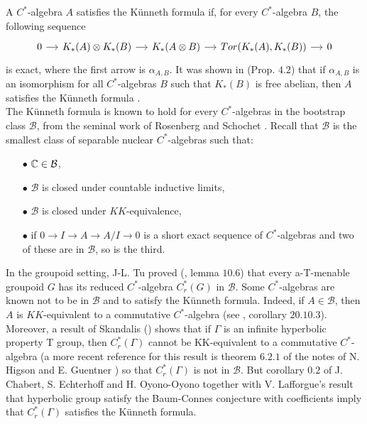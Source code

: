 A $C^*$-algebra $A$ satisfies the Künneth formula if, for every $C^*$-algebra $B$, the following sequence 
\[\begin{tikzcd}[column sep = small] 
0 \arrow{r} & K_*(A)\otimes K_*(B)\arrow{r} & K_*(A\otimes B) \arrow{r} & Tor(K_*(A),K_*(B))\arrow{r} & 0 
\end{tikzcd}\]
is exact, where the first arrow is $\alpha_{A,B}$. It was shown in \cite{ChabertEOY} (Prop. $4.2$) that if $\alpha_{A,B}$ is an isomorphism for all $C^*$-algebras $B$ such that $K_*(B)$ is free abelian, then $A$ satisfies the Künneth formula .\\ 

The Künneth formula is known to hold for every $C^*$-algebras in the bootstrap class $\mathcal B$, from the seminal work of Rosenberg and Schochet \cite{RosenbergKunneth}. Recall that $\mathcal B$ is the smallest class of separable nuclear $C^*$-algebras such that:
\begin{itemize}
\item[$\bullet$] $\mathbb C \in \mathcal B$,
\item[$\bullet$] $\mathcal B$ is closed under countable inductive limits,  
\item[$\bullet$] $\mathcal B$ is closed under $KK$-equivalence,
\item[$\bullet$] if $0 \rightarrow I \rightarrow A \rightarrow A/I \rightarrow 0$ is a short exact sequence of $C^*$-algebras and two of these are in $\mathcal B$, so is the third. 
\end{itemize}
In the groupoid setting, J-L. Tu proved (\cite{TuThese}, lemma $10.6$) that every a-T-menable groupoid $G$ has its reduced $C^*$-algebra $C^*_r(G)$ in $\mathcal B$. Some $C^*$-algebras are known not to be in $\mathcal B$ and to satisfy the Künneth formula. Indeed, if $A\in \mathcal B$, then $A$ is $KK$-equivalent to a commutative $C^*$-algebra (see \cite{blackadar}, corollary $20.10.3$). Moreover, a result of Skandalis (\cite{SkandalisNotion}) shows that if $\Gamma$ is an infinite hyperbolic property T group, then $C^*_r(\Gamma)$ cannot be KK-equivalent to a commutative $C^*$-algebra (a more recent reference for this result is theorem $6.2.1$ of the notes of N. Higson and E. Guentner \cite{HigsonGuentnerNotes}) so that $C^*_r(\Gamma)$ is not in $\mathcal B$. But corollary $0.2$ of J. Chabert, S. Echterhoff and H. Oyono-Oyono \cite{ChabertEOY} together with V. Lafforgue's result \cite{lafforgue2012conjecture} that hyperbolic group satisfy the Baum-Connes conjecture with coefficients imply that $C^*_r(\Gamma)$ satisfies the Künneth formula.\\

